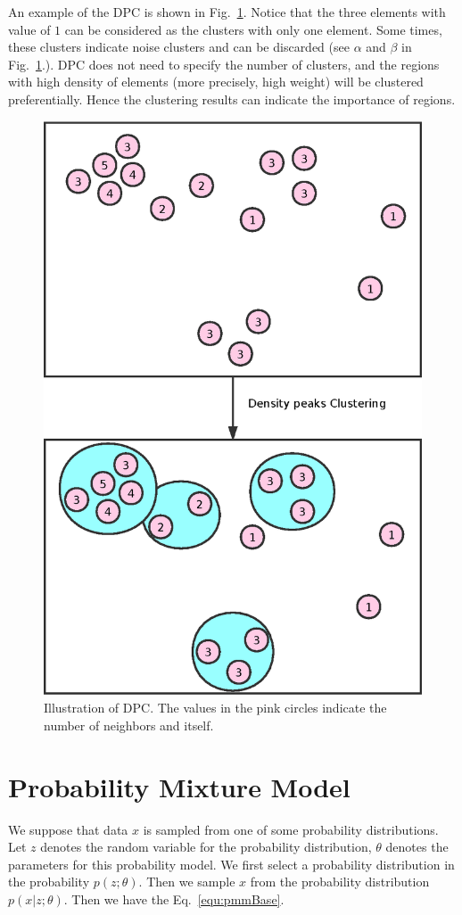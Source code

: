 \documentclass[runningheads,openany]{xhlPaper}
\begin{document}
An example of the DPC is shown in Fig.~\ref{fig:density_peaks}. Notice that the three elements with value of $1$ can be considered as the clusters with only one element.  Some times, these clusters indicate noise clusters and can be discarded (see $\alpha$ and $\beta$ in Fig.~\ref{fig:density_peaks}.). 
DPC does not need to specify the number of clusters, and the regions with high density of elements (more precisely, high weight) will be clustered preferentially. Hence the clustering results can indicate the importance of regions. 

\begin{figure}
\centering
\includegraphics[width=0.7\linewidth]{density_peaks}
\caption{Illustration of DPC. The values in the pink circles indicate the number of neighbors and itself. }
\label{fig:density_peaks}
\end{figure}

\section{Probability Mixture Model}
We suppose that data $x$ is sampled from one of some probability distributions. 
Let $z$ denotes the random variable for the probability distribution, $\theta$ denotes the parameters for this probability model.
We first select a probability distribution in the probability $p\left( {z;\theta } \right)$. Then we sample $x$ from the probability distribution $p\left( {x|z;\theta } \right)$. 
Then we have the Eq.~\ref{equ:pmmBase}. 
\end{document}
